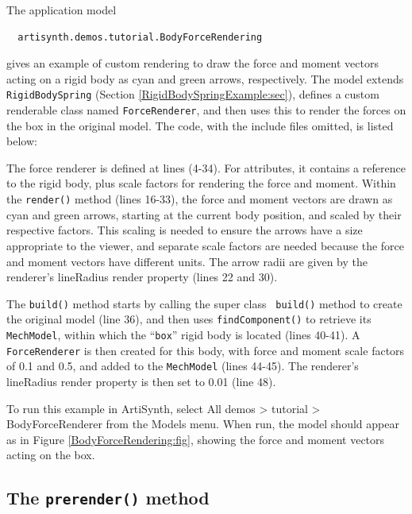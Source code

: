 The application model
%
\begin{verbatim}
  artisynth.demos.tutorial.BodyForceRendering
\end{verbatim}
%
gives an example of custom rendering to draw the force and moment
vectors acting on a rigid body as cyan and green arrows,
respectively. The model extends {\tt RigidBodySpring}
(Section \ref{RigidBodySpringExample:sec}), defines a custom
renderable class named {\tt ForceRenderer}, and then uses this to
render the forces on the box in the original model. The code, with the
include files omitted, is listed below:
%
\lstset{numbers=left}
\iflatexml

\else

\fi
\lstset{numbers=none}
%
The force renderer is defined at lines (4-34). For attributes, it
contains a reference to the rigid body, plus scale factors for
rendering the force and moment. Within the {\tt render()} method
(lines 16-33), the force and moment vectors are drawn as cyan and green
arrows, starting at the current body position, and scaled by their
respective factors. This scaling is needed to ensure the arrows have a
size appropriate to the viewer, and separate scale factors are needed
because the force and moment vectors have different units. The arrow
radii are given by the renderer's {\sf lineRadius} render property
(lines 22 and 30).

The {\tt build()} method starts by calling the super class {\tt
build()} method to create the original model (line 36), and then uses
{\tt findComponent()} to retrieve its {\tt MechModel}, within which
the ``{\tt box}'' rigid body is located (lines 40-41). A {\tt
ForceRenderer} is then created for this body, with force and moment
scale factors of 0.1 and 0.5, and added to the {\tt MechModel} (lines
44-45). The renderer's {\sf lineRadius} render property is then set to
0.01 (line 48).

To run this example in ArtiSynth, select {\sf All demos > tutorial >
BodyForceRenderer} from the {\sf Models} menu. When run, the model
should appear as in Figure \ref{BodyForceRendering:fig}, showing the
force and moment vectors acting on the box.

\subsection{The {\tt prerender()} method}
\label{PrerenderMethod:sec}

